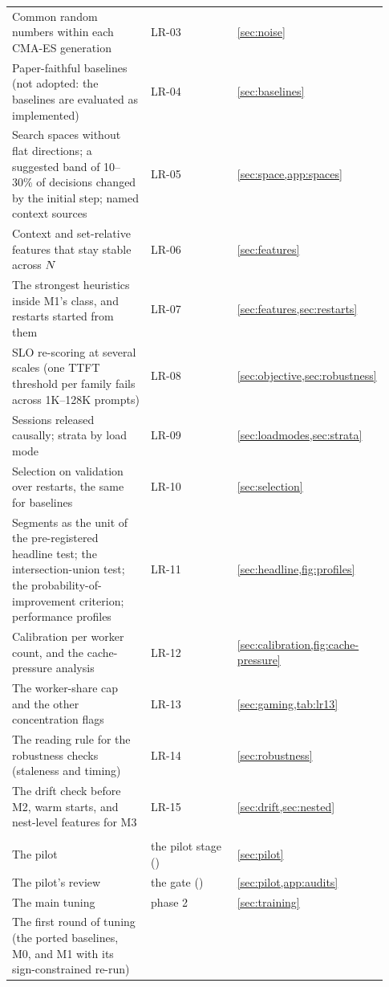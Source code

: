 {\begin{longtable}{@{}P{0.42\linewidth}P{0.27\linewidth}P{0.24\linewidth}@{}}
Common random numbers within each CMA-ES generation & LR-03 & \cref{sec:noise} \\
Paper-faithful baselines (not adopted: the baselines are evaluated as implemented) & LR-04 &
  \cref{sec:baselines} \\
Search spaces without flat directions; a suggested band of 10--30\% of decisions changed by the
  initial step; named context sources & LR-05 & \cref{sec:space,app:spaces} \\
Context and set-relative features that stay stable across $N$ & LR-06 & \cref{sec:features} \\
The strongest heuristics inside M1's class, and restarts started from them & LR-07 &
  \cref{sec:features,sec:restarts} \\
SLO re-scoring at several scales (one TTFT threshold per family fails across 1K--128K prompts) &
  LR-08 & \cref{sec:objective,sec:robustness} \\
Sessions released causally; strata by load mode & LR-09 & \cref{sec:loadmodes,sec:strata} \\
Selection on validation over restarts, the same for baselines & LR-10 & \cref{sec:selection} \\
Segments as the unit of the pre-registered headline test; the intersection-union test; the
  probability-of-improvement criterion; performance profiles & LR-11 &
  \cref{sec:headline,fig:profiles} \\
Calibration per worker count, and the cache-pressure analysis & LR-12 &
  \cref{sec:calibration,fig:cache-pressure} \\
The worker-share cap and the other concentration flags & LR-13 & \cref{sec:gaming,tab:lr13} \\
The reading rule for the robustness checks (staleness and timing) & LR-14 & \cref{sec:robustness}
  \\
The drift check before M2, warm starts, and nest-level features for M3 & LR-15 &
  \cref{sec:drift,sec:nested} \\
\LTgrouprule
{} \\*
The pilot & the pilot stage () & \cref{sec:pilot} \\
The pilot's review & the gate () & \cref{sec:pilot,app:audits} \\
The main tuning & phase 2 & \cref{sec:training} \\
The first round of tuning (the ported baselines, M0, and M1 with its sign-constrained re-run) &

\end{longtable}}
